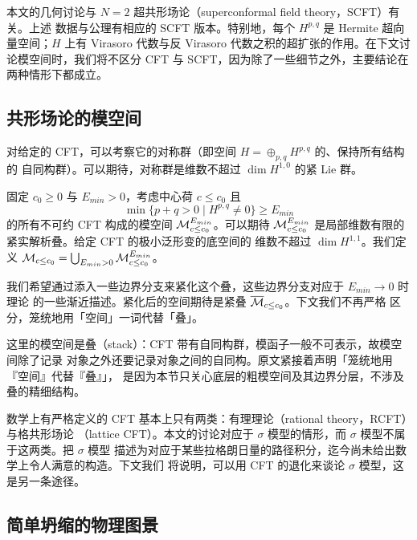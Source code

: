 \begin{rmk}
本文的几何讨论与 $N=2$ 超共形场论（superconformal field theory，SCFT）有关。上述
数据与公理有相应的 SCFT 版本。特别地，每个 $H^{p,q}$ 是 Hermite 超向量空间；$H$ 上有
Virasoro 代数与反 Virasoro 代数之积的超扩张的作用。在下文讨论模空间时，我们将不区分
CFT 与 SCFT，因为除了一些细节之外，主要结论在两种情形下都成立。
\end{rmk}

\subsection{共形场论的模空间}

对给定的 CFT，可以考察它的对称群（即空间 $H=\oplus_{p,q}H^{p,q}$ 的、保持所有结构的
自同构群）。可以期待，对称群是维数不超过 $\dim H^{1,0}$ 的紧 Lie 群。

固定 $c_0\ge0$ 与 $E_{min}>0$，考虑中心荷 $c\le c_0$ 且
\[
  \min\{p+q>0\mid H^{p,q}\ne0\}\ge E_{min}
\]
的所有不可约 CFT 构成的模空间 $\mathcal{M}^{E_{min}}_{c\le c_0}$。可以期待
$\mathcal{M}^{E_{min}}_{c\le c_0}$ 是局部维数有限的紧实解析叠。给定 CFT 的极小泛形变的底空间的
维数不超过 $\dim H^{1,1}$。我们定义
$\mathcal{M}_{c\le c_0}=\bigcup_{E_{min}>0}\mathcal{M}^{E_{min}}_{c\le c_0}$。

我们希望通过添入一些边界分支来紧化这个叠，这些边界分支对应于 $E_{min}\to0$ 时理论
的一些渐近描述。紧化后的空间期待是紧叠 $\overline{\mathcal{M}}_{c\le c_0}$。下文我们不再严格
区分，笼统地用「空间」一词代替「叠」。

\begin{yizhu}[「叠」与「空间」]
这里的模空间是叠（stack）：CFT 带有自同构群，模函子一般不可表示，故模空间除了记录
对象之外还要记录对象之间的自同构。原文紧接着声明「笼统地用『空间』代替『叠』」，
是因为本节只关心底层的粗模空间及其边界分层，不涉及叠的精细结构。
\end{yizhu}

\begin{rmk}
数学上有严格定义的 CFT 基本上只有两类：有理理论（rational theory，RCFT）与格共形场论
（lattice CFT）。本文的讨论对应于 $\sigma$ 模型的情形，而 $\sigma$ 模型不属于这两类。把 $\sigma$ 模型
描述为对应于某些拉格朗日量的路径积分，迄今尚未给出数学上令人满意的构造。下文我们
将说明，可以用 CFT 的退化来谈论 $\sigma$ 模型，这是另一条途径。
\end{rmk}

\subsection{简单坍缩的物理图景}

